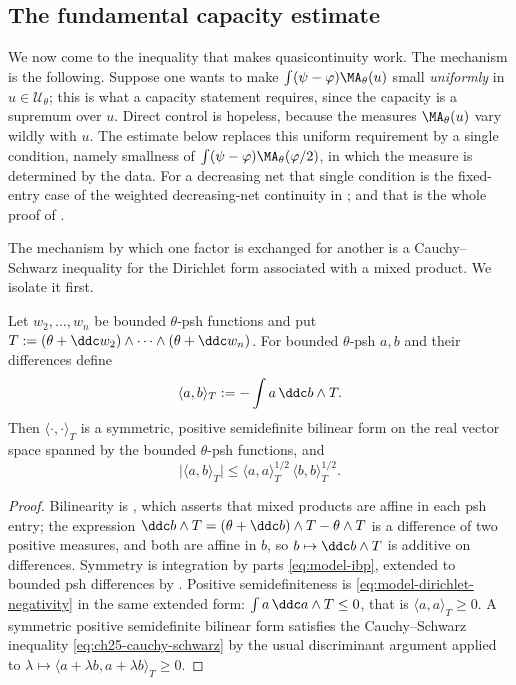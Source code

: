 \subsection{The fundamental capacity estimate}
\label{sec:ch25-fundamental}

We now come to the inequality that makes quasicontinuity work.  The
mechanism is the following.  Suppose one wants to make
$\int(\psi-\varphi)\MA_\theta(u)$ small \emph{uniformly} in
$u\in\mathcal U_\theta$; this is what a capacity statement requires, since
the capacity is a supremum over $u$.  Direct control is hopeless, because
the measures $\MA_\theta(u)$ vary wildly with $u$.  The estimate below
replaces this uniform requirement by a single condition, namely smallness of
$\int(\psi-\varphi)\MA_\theta(\varphi/2)$, in which the measure is
determined by the data.  For a decreasing net that single condition is the
fixed-entry case of the weighted decreasing-net continuity in
; and that is the whole proof of
.

The mechanism by which one factor is exchanged for another is a
Cauchy--Schwarz inequality for the Dirichlet form associated with a mixed
product.  We isolate it first.

\begin{lemma}
\label{lem:ch25-dirichlet-form}
Let $w_2,\ldots,w_n$ be bounded $\theta$-psh functions and put
$T:=(\theta+\ddc w_2)\wedge\cdots\wedge(\theta+\ddc w_n)$.  For bounded
$\theta$-psh $a,b$ and their differences define
\[
 \langle a,b\rangle_T:=-\int a\,\ddc b\wedge T .
\]
Then $\langle\cdot,\cdot\rangle_T$ is a symmetric, positive semidefinite
bilinear form on the real vector space spanned by the bounded
$\theta$-psh functions, and
\begin{equation}
\label{eq:ch25-cauchy-schwarz}
 \bigl|\langle a,b\rangle_T\bigr|
 \leq\langle a,a\rangle_T^{1/2}\,\langle b,b\rangle_T^{1/2}.
\end{equation}
\end{lemma}

\begin{proof}
Bilinearity is , which asserts that mixed
products are affine in each psh entry; the expression
$\ddc b\wedge T=(\theta+\ddc b)\wedge T-\theta\wedge T$ is a difference of
two positive measures, and both are affine in $b$, so
$b\mapsto\ddc b\wedge T$ is additive on differences.  Symmetry is
integration by parts \eqref{eq:model-ibp}, extended to bounded psh
differences by .  Positive
semidefiniteness is \eqref{eq:model-dirichlet-negativity} in the same
extended form: $\int a\,\ddc a\wedge T\leq0$, that is
$\langle a,a\rangle_T\geq0$.  A symmetric positive semidefinite bilinear
form satisfies the Cauchy--Schwarz inequality
\eqref{eq:ch25-cauchy-schwarz} by the usual discriminant argument applied to
$\lambda\mapsto\langle a+\lambda b,a+\lambda b\rangle_T\geq0$.
\end{proof}

